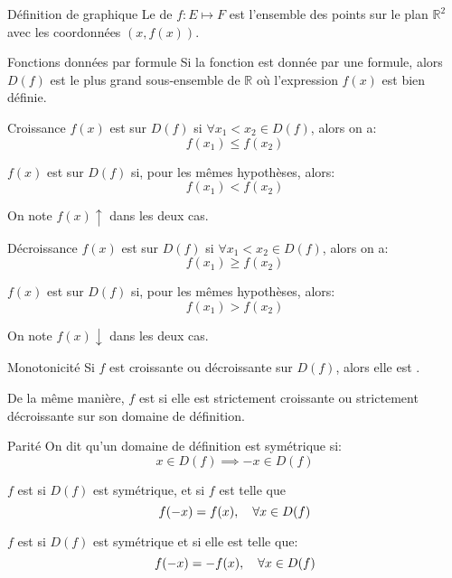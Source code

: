 \documentclass[a4paper]{article}
\begin{document}
\begin{parag}{Définition de graphique}
    Le  de $f: E \mapsto F$ est l'ensemble des points sur le plan $\mathbb{R}^2$ avec les coordonnées $\left(x, f\left(x\right)\right)$.
\end{parag}

\begin{parag}{Fonctions données par formule}
    Si la fonction est donnée par une formule, alors $D\left(f\right)$ est le plus grand sous-ensemble de $\mathbb{R}$ où l'expression $f\left(x\right)$ est bien définie.
\end{parag}

\begin{parag}{Croissance}
    $f\left(x\right)$ est  sur $D\left(f\right)$ si $\forall x_1 < x_2 \in D\left(f\right)$, alors on a:
    \[f\left(x_1\right) \leq f\left(x_2\right)\]

    $f\left(x\right)$ est  sur $D\left(f\right)$ si, pour les mêmes hypothèses, alors: 
    \[f\left(x_1\right) < f\left(x_2\right)\]
    
    On note $f\left(x\right)\uparrow$ dans les deux cas.
\end{parag}

\begin{parag}{Décroissance}
    $f\left(x\right)$ est  sur $D\left(f\right)$ si $\forall x_1 < x_2 \in D\left(f\right)$, alors on a:
    \[f\left(x_1\right) \geq f\left(x_2\right)\]

    $f\left(x\right)$ est  sur $D\left(f\right)$ si, pour les mêmes hypothèses, alors: 
    \[f\left(x_1\right) > f\left(x_2\right)\]
    
    On note $f\left(x\right)\downarrow$ dans les deux cas.
\end{parag}

\begin{parag}{Monotonicité}
    Si $f$ est croissante ou décroissante sur $D\left(f\right)$, alors elle est .

    De la même manière, $f$ est  si elle est strictement croissante ou strictement décroissante sur son domaine de définition.
\end{parag}

\begin{parag}{Parité}
    On dit qu'un domaine de définition est symétrique si: 
    \[x \in D\left(f\right) \implies -x \in D\left(f\right)\]
    

    $f$ est  si $D\left(f\right)$ est symétrique, et si $f$ est telle que 
    \[f\left(-x\right) = f\left(x\right), \mathspace \forall x \in D\left(f\right)\]

        
    $f$ est  si $D\left(f\right)$ est symétrique et si elle est telle que:
    \[f\left(-x\right) = -f\left(x\right), \mathspace \forall x \in D\left(f\right)\]
\end{parag}
\end{document}
